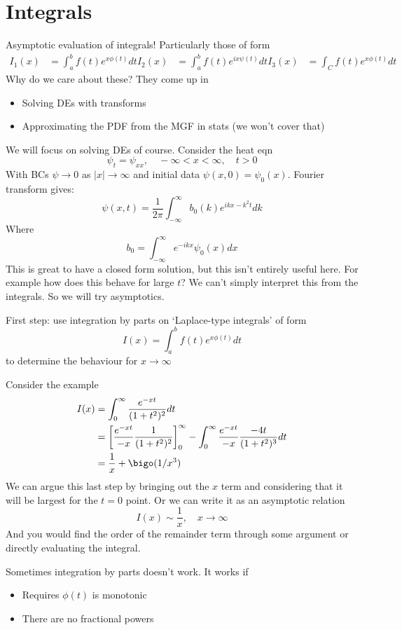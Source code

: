 \documentclass{X:/Documents/Coding/Latex/myassignment}
\begin{document}
\section{Integrals}
Asymptotic evaluation of integrals!
Particularly those of form
\begin{align*}
    I_1(x) &= \int_a^b f(t) e^{x\phi(t)} dt
    I_2(x) &= \int_a^b f(t) e^{ix\psi(t)} dt
    I_3(x) &= \int_C f(t) e^{x\phi(t)} dt
\end{align*}
Why do we care about these? They come up in 
\begin{itemize}
    \item Solving DEs with transforms
    \item Approximating the PDF from the MGF in stats (we won't cover that)
\end{itemize}

We will focus on solving DEs of course.
Consider the heat eqn
\[\psi_t = \psi_{xx}, \quad -\infty < x < \infty, \quad t >0\]
With BCs $\psi \to 0$ as $|x| \to \infty$ and initial data $\psi(x,0) = \psi_0(x)$. Fourier transform gives:
\[\psi(x,t) = \frac1{2\pi} \int_{-\infty}^\infty b_0(k) e^{ikx - k^2 t} dk\]
Where 
\[b_0 = \int_{-\infty}^\infty e^{-ikx} \psi_0(x) dx\]
This is great to have a closed form solution, but this isn't entirely useful here. For example how does this behave for large $t$? We can't simply interpret this from the integrals. So we will try asymptotics.

First step: use integration by parts on `Laplace-type integrals' of form
\[I(x) = \int_a^b f(t)e^{x\phi(t)} dt\]
to determine the behaviour for $x\to\infty$

Consider the example
\begin{align*}
    I(x) &= \int_0^\infty \frac{e^{-xt}}{(1+t^2)^2}d t\\
    &=\left[\frac{e^{-xt}}{-x} \frac{1}{(1+t^2)^2}\right]_0^\infty - \int_0^\infty \frac{e^{-xt}}{-x} \frac{-4t}{(1+t^2)^3}dt\\
    &= \frac1x + \bigo(1/x^3) 
\end{align*}
We can argue this last step by bringing out the $x$ term and considering that it will be largest for the $t=0$ point.
Or we can write it as an asymptotic relation
\[I(x) \sim \frac1x , \quad x\to\infty\]
And you would find the order of the remainder term through some argument or directly evaluating the integral.


Sometimes integration by parts doesn't work. It works if
\begin{itemize}
    \item Requires $\phi(t)$ is monotonic
    \item There are no fractional powers
\end{itemize}
\end{document}
